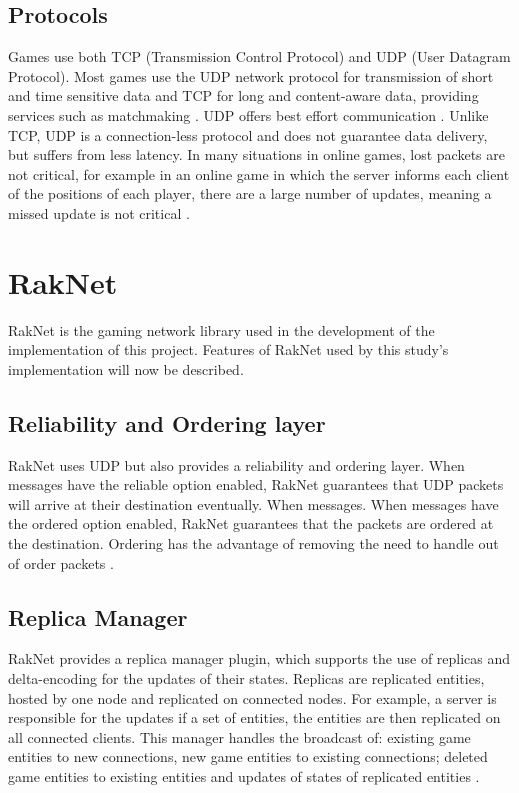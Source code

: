 \subsection{Protocols}
Games use both TCP (Transmission Control Protocol) and UDP (User Datagram Protocol). Most games use the UDP network protocol for transmission of short and time sensitive data and TCP for long and content-aware data, providing services such as matchmaking \cite{2018NetworkTraffic, 2012PacketLevelTraffic}. UDP offers best effort communication . Unlike TCP, UDP is a connection-less protocol and does not guarantee data delivery, but suffers from less latency. In many situations in online games, lost packets are not critical, for example in an online game in which  the server informs each client of the positions of each player, there are a large number of updates, meaning a missed update is not critical \cite{pisan2004challenges}. 

\section{RakNet}
RakNet is the gaming network library used in the development of the implementation of this project. Features of RakNet used by this study's implementation will now be described.

\subsection{Reliability and Ordering layer}
RakNet uses UDP but also provides a reliability and ordering layer. When messages have the reliable option enabled, RakNet guarantees that UDP packets will arrive at their destination eventually. When messages. When messages have the ordered option enabled, RakNet guarantees that the packets are ordered at the destination. Ordering has the advantage of removing the need to handle out of order packets \cite{RakNetReliability}.

\subsection{Replica Manager}
RakNet provides a replica manager plugin, which supports the use of replicas and delta-encoding for the updates of their states. Replicas are replicated entities, hosted by one node and replicated on connected nodes. For example, a server is responsible for the updates if a set of entities, the entities are then replicated on all connected clients. This manager handles the broadcast of: existing game entities to new connections, new game entities to existing connections; deleted game entities to existing entities and updates of states of replicated entities \cite{RakNetReplica}.

